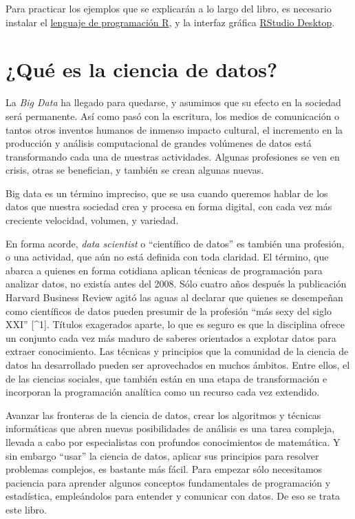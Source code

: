 \documentclass[spanish,]{book}
\begin{document}
Para practicar los ejemplos que se explicarán a lo largo del libro, es necesario instalar el \href{https://cloud.r-project.org/}{lenguaje de programación R}, y la interfaz gráfica \href{https://www.rstudio.com/products/rstudio/download/}{RStudio Desktop}.

\hypertarget{quuxe9-es-la-ciencia-de-datos}{%
\chapter{¿Qué es la ciencia de datos?}\label{quuxe9-es-la-ciencia-de-datos}}

La \emph{Big Data} ha llegado para quedarse, y asumimos que su efecto en la sociedad será permanente. Así como pasó con la escritura, los medios de comunicación o tantos otros inventos humanos de inmenso impacto cultural, el incremento en la producción y análisis computacional de grandes volúmenes de datos está transformando cada una de nuestras actividades. Algunas profesiones se ven en crisis, otras se benefician, y también se crean algunas nuevas.

Big data es un término impreciso, que se usa cuando queremos hablar de los datos que nuestra sociedad crea y procesa en forma digital, con cada vez más creciente velocidad, volumen, y variedad.

En forma acorde, \emph{data scientist} o ``científico de datos'' es también una profesión, o una actividad, que aún no está definida con toda claridad. El término, que abarca a quienes en forma cotidiana aplican técnicas de programación para analizar datos, no existía antes del 2008. Sólo cuatro años después la publicación Harvard Business Review agitó las aguas al declarar que quienes se desempeñan como científicos de datos pueden presumir de la profesión ``más sexy del siglo XXI'' {[}\^{}1{]}. Títulos exagerados aparte, lo que es seguro es que la disciplina ofrece un conjunto cada vez más maduro de saberes orientados a explotar datos para extraer conocimiento. Las técnicas y principios que la comunidad de la ciencia de datos ha desarrollado pueden ser aprovechados en muchos ámbitos. Entre ellos, el de las ciencias sociales, que también están en una etapa de transformación e incorporan la programación analítica como un recurso cada vez extendido.

Avanzar las fronteras de la ciencia de datos, crear los algoritmos y técnicas informáticas que abren nuevas posibilidades de análisis es una tarea compleja, llevada a cabo por especialistas con profundos conocimientos de matemática. Y sin embargo ``usar'' la ciencia de datos, aplicar sus principios para resolver problemas complejos, es bastante más fácil. Para empezar sólo necesitamos paciencia para aprender algunos conceptos fundamentales de programación y estadística, empleándolos para entender y comunicar con datos. De eso se trata este libro.
\end{document}
